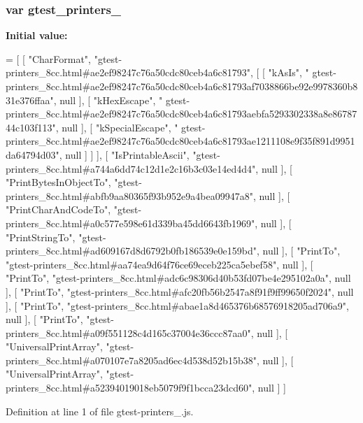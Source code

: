 \subsubsection[{\texorpdfstring{gtest\+\_\+printers\+\_\+8cc}{gtest_printers_8cc}}]{\setlength{\rightskip}{0pt plus 5cm}var gtest\+\_\+printers\+\_}\hypertarget{gtest-printers__8cc_8js_a9ea37de3b5d736b33bbd1ed5dea0cecd}{}\label{gtest-printers__8cc_8js_a9ea37de3b5d736b33bbd1ed5dea0cecd}
{\bfseries Initial value\+:}
\begin{DoxyCode}
=
[
    [ \textcolor{stringliteral}{"CharFormat"}, \textcolor{stringliteral}{"gtest-printers\_8cc.html#ae2ef98247c76a50cdc80ceb4a6c81793"}, [
      [ \textcolor{stringliteral}{"kAsIs"}, \textcolor{stringliteral}{"
      gtest-printers\_8cc.html#ae2ef98247c76a50cdc80ceb4a6c81793af7038866be92e9978360b831e376ffaa"}, null ],
      [ \textcolor{stringliteral}{"kHexEscape"}, \textcolor{stringliteral}{"
      gtest-printers\_8cc.html#ae2ef98247c76a50cdc80ceb4a6c81793aebfa5293302338a8e8678744c103f113"}, null ],
      [ \textcolor{stringliteral}{"kSpecialEscape"}, \textcolor{stringliteral}{"
      gtest-printers\_8cc.html#ae2ef98247c76a50cdc80ceb4a6c81793ae1211108e9f35f891d9951da64794d03"}, null ]
    ] ],
    [ \textcolor{stringliteral}{"IsPrintableAscii"}, \textcolor{stringliteral}{"gtest-printers\_8cc.html#a744a6dd74c12d1e2c16b3c03e14ed4d4"}, null ],
    [ \textcolor{stringliteral}{"PrintBytesInObjectTo"}, \textcolor{stringliteral}{"gtest-printers\_8cc.html#abfb9aa80365f93b952e9a4bea09947a8"}, null ],
    [ \textcolor{stringliteral}{"PrintCharAndCodeTo"}, \textcolor{stringliteral}{"gtest-printers\_8cc.html#a0c577e598e61d339ba45dd6643fb1969"}, null ],
    [ \textcolor{stringliteral}{"PrintStringTo"}, \textcolor{stringliteral}{"gtest-printers\_8cc.html#ad609167d8d6792b0fb186539e0e159bd"}, null ],
    [ \textcolor{stringliteral}{"PrintTo"}, \textcolor{stringliteral}{"gtest-printers\_8cc.html#aa74ea9d64f76ce69eceb225ca5ebef58"}, null ],
    [ \textcolor{stringliteral}{"PrintTo"}, \textcolor{stringliteral}{"gtest-printers\_8cc.html#adc6c98306d40b53fd07be4e295102a0a"}, null ],
    [ \textcolor{stringliteral}{"PrintTo"}, \textcolor{stringliteral}{"gtest-printers\_8cc.html#afc20fb56b2547a8f91f9ff99650f2024"}, null ],
    [ \textcolor{stringliteral}{"PrintTo"}, \textcolor{stringliteral}{"gtest-printers\_8cc.html#abae1a8d465376b68576918205ad706a9"}, null ],
    [ \textcolor{stringliteral}{"PrintTo"}, \textcolor{stringliteral}{"gtest-printers\_8cc.html#a09f551128c4d165c37004e36ccc87aa0"}, null ],
    [ \textcolor{stringliteral}{"UniversalPrintArray"}, \textcolor{stringliteral}{"gtest-printers\_8cc.html#a070107e7a8205ad6ec4d538d52b15b38"}, null ],
    [ \textcolor{stringliteral}{"UniversalPrintArray"}, \textcolor{stringliteral}{"gtest-printers\_8cc.html#a52394019018eb5079f9f1bcca23dcd60"}, null ]
]
\end{DoxyCode}


Definition at line 1 of file gtest-\/printers\+\_.\+js.

